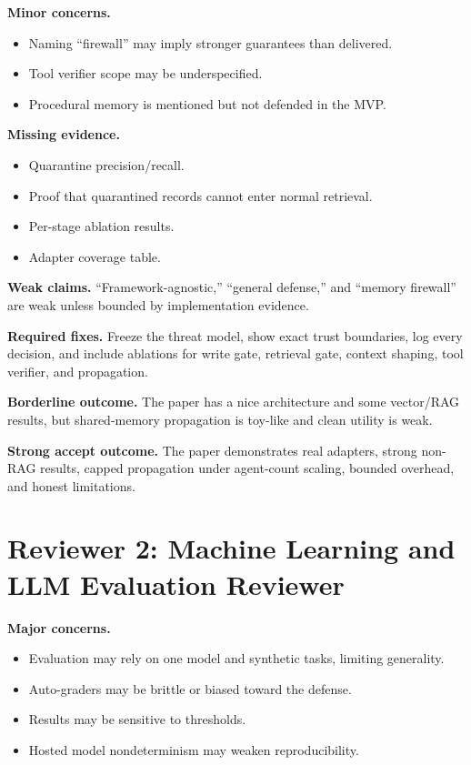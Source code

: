 \documentclass[11pt,oneside]{report}
\begin{document}
\textbf{Minor concerns.}
\begin{itemize}
  \item Naming ``firewall'' may imply stronger guarantees than delivered.
  \item Tool verifier scope may be underspecified.
  \item Procedural memory is mentioned but not defended in the MVP.
\end{itemize}

\textbf{Missing evidence.}
\begin{itemize}
  \item Quarantine precision/recall.
  \item Proof that quarantined records cannot enter normal retrieval.
  \item Per-stage ablation results.
  \item Adapter coverage table.
\end{itemize}

\textbf{Weak claims.} ``Framework-agnostic,'' ``general defense,'' and ``memory firewall'' are weak
unless bounded by implementation evidence.

\textbf{Required fixes.} Freeze the threat model, show exact trust boundaries, log every decision,
and include ablations for write gate, retrieval gate, context shaping, tool verifier, and propagation.

\textbf{Borderline outcome.} The paper has a nice architecture and some vector/RAG results, but
shared-memory propagation is toy-like and clean utility is weak.

\textbf{Strong accept outcome.} The paper demonstrates real adapters, strong non-RAG results, capped
propagation under agent-count scaling, bounded overhead, and honest limitations.

\section{Reviewer 2: Machine Learning and LLM Evaluation Reviewer}

\textbf{Major concerns.}
\begin{itemize}
  \item Evaluation may rely on one model and synthetic tasks, limiting generality.
  \item Auto-graders may be brittle or biased toward the defense.
  \item Results may be sensitive to thresholds.
  \item Hosted model nondeterminism may weaken reproducibility.
\end{itemize}
\end{document}
